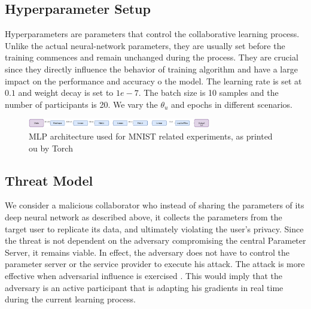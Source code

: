 \documentclass[conference]{IEEEtran}
\begin{document}
\subsection{Hyperparameter Setup}

Hyperparameters are parameters that control the collaborative learning process. Unlike the actual neural-network parameters, they are usually set before the training commences and remain unchanged during the process.
They are crucial since they directly influence the behavior of training algorithm and have a large impact on the performance and accuracy o the model.
The learning rate is set at $0.1$ and weight decay is set to $1e-7$. The batch size is 10 samples and the number of participants is 20. We vary the $\theta_u$ and epochs in different scenarios. 

\begin{figure}[!h]
\includegraphics[width=8cm, keepaspectratio]{MLPArchitecture}
\caption{MLP architecture used for MNIST related experiments, as printed ou by Torch}
\label{fig:MLPArch}

\end{figure}

\subsection{Threat Model}

We consider a malicious collaborator who instead of sharing the parameters of its deep neural
network as described above, it collects the parameters from the target user to replicate its data, and ultimately violating the user's
privacy.  
Since the threat is not{} dependent on the adversary compromising the
central Parameter Server, it remains viable. In effect, the adversary does not have to control the parameter server or the service
provider to execute his attack. The attack is more effective when adversarial influence is exercised \cite{hitaj2017deep}. This would
imply that
the adversary is an active participant that is adapting his gradients in real time during the current learning process.
\end{document}
